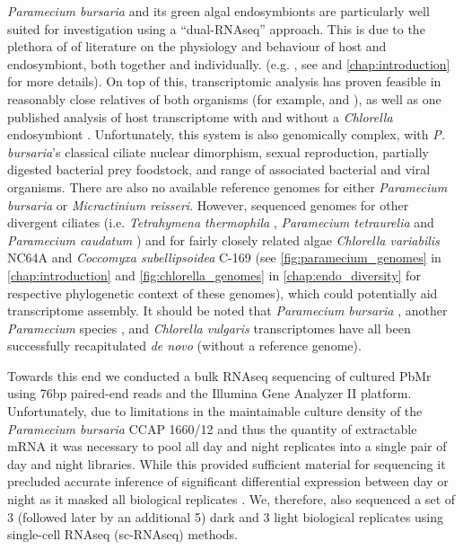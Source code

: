 \textit{Paramecium bursaria} and its green algal endosymbionts are particularly well suited for investigation
using a ``dual-RNAseq'' approach.  This is due to the plethora of 
of literature on the physiology and behaviour of host and endosymbiont, both together and individually.
(e.g. \citep{Iwatsuki1988}, see \citep{Kato2009a} and \ref{chap:introduction} for more details).
On top of this, transcriptomic analysis has proven feasible in reasonably close relatives of both organisms 
(for example, \citep{Guarnieri2011,Rowe2014,Bashan2015} and \citep{Arnaiz2010,Kolisko2014}), as well as
one published analysis of host transcriptome with and without a \textit{Chlorella} endosymbiont \citep{Kodama2014}.
Unfortunately, this system is also genomically complex, with \textit{P. bursaria}'s classical ciliate nuclear
dimorphism, sexual reproduction, partially digested bacterial prey foodstock, and range of associated
bacterial and viral organisms.  There are also no available reference genomes for either \textit{Paramecium bursaria} or \textit{Micractinium reisseri}.
However, sequenced genomes for other divergent ciliates (i.e. \textit{Tetrahymena thermophila} \citep{Eisen2006}, \textit{Paramecium tetraurelia} \citep{Aury2006} and \textit{Paramecium caudatum}
\citep{McGrath2014}) and for fairly closely related algae \textit{Chlorella variabilis} NC64A \citep{Blanc2010} and \textit{Coccomyxa subellipsoidea} C-169 \citep{Blanc2012}
(see \ref{fig:paramecium_genomes} in \ref{chap:introduction} and \ref{fig:chlorella_genomes} in \ref{chap:endo_diversity} for respective phylogenetic context of these genomes), 
which could potentially aid transcriptome assembly.  
It should be noted that  
\textit{Paramecium bursaria} \citep{Kodama2014}, another \textit{Paramecium} species \citep{Kolisko2014}, and \textit{Chlorella vulgaris} \citep{Guarnieri2011} transcriptomes have all
been successfully recapitulated \textit{de novo} (without a reference genome).


Towards this end we conducted a bulk RNAseq sequencing of cultured PbMr using 76bp paired-end reads and the Illumina Gene Analyzer II platform.
Unfortunately, due to limitations in the maintainable culture density of the \textit{Paramecium bursaria} CCAP 1660/12 and thus the quantity of extractable
mRNA it was necessary to pool all day and night replicates into a single pair of day and night libraries. 
While this provided sufficient material for sequencing it precluded accurate inference of significant differential expression between day or night
as it masked all biological replicates \citep{Auer2010}.  We, therefore, also sequenced a set of 3 (followed later by an additional 5) dark and 3 light
biological replicates using single-cell RNAseq (sc-RNAseq) methods. 


